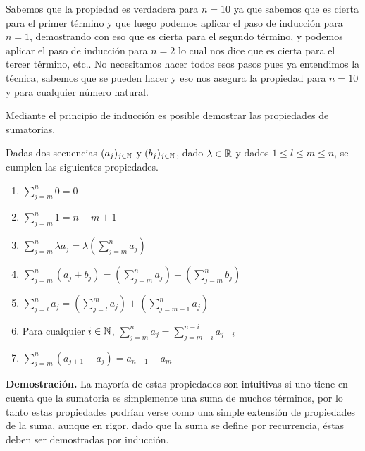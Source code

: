 Sabemos que la propiedad es verdadera para $n=10$ ya que sabemos que es cierta para el primer término y que luego podemos aplicar el paso de inducción para $n=1$, demostrando con eso que es cierta para el segundo término, y podemos aplicar el paso de inducción para $n=2$ lo cual nos dice que es cierta para el tercer término, etc.. No necesitamos hacer todos esos pasos pues ya entendimos la técnica, sabemos que se pueden hacer y eso nos asegura la propiedad para $n=10$ y para cualquier número natural.

Mediante el principio de inducción es posible demostrar las propiedades de sumatorias.

\medskip

\begin{prop} Dadas dos secuencias $(a_j)_{j\in\mathbb{N}}$ y $(b_j)_{j\in\mathbb{N}}$, dado $\lambda\in\mathbb{R}$ y dados $1\le l\le m\le n$, se cumplen las siguientes propiedades.
\begin{enumerate}
\item\label{it:0} ${\displaystyle \sum_{j=m}^n 0=0}$
\item\label{it:cte} ${\displaystyle  \sum_{j=m}^n 1=n-m+1}$
\item\label{it:ponderacion} ${\displaystyle  \sum_{j=m}^n \lambda a_j=\lambda\left(\sum_{j=m}^n a_j\right)}$
\item\label{it:suma} ${\displaystyle  \sum_{j=m}^n (a_j+b_j)=\left(\sum_{j=m}^n a_j\right)+\left(\sum_{j=m}^n b_j\right)}$
\item\label{it:separacion} ${\displaystyle  \sum_{j=l}^n a_j=\left(\sum_{j=l}^m a_j\right)+\left(\sum_{j=m+1}^n a_j\right)}$
\item\label{it:variable} Para cualquier $i\in\mathbb{N}$, ${\displaystyle  \sum_{j=m}^n a_j=\sum_{j=m-i}^{n-i} a_{j+i}}$
\item\label{it:telescopica} ${\displaystyle \sum_{j=m}^n (a_{j+1}-a_j)=a_{n+1}-a_m}$
\end{enumerate}
\end{prop}
{\bf Demostración.}
La mayoría de estas propiedades son intuitivas si uno tiene en cuenta que la sumatoria es simplemente una suma de muchos términos, por lo tanto estas propiedades podrían verse como una simple extensión de propiedades de la suma, aunque en rigor, dado que la suma se define por recurrencia, éstas deben ser demostradas por inducción.\\

